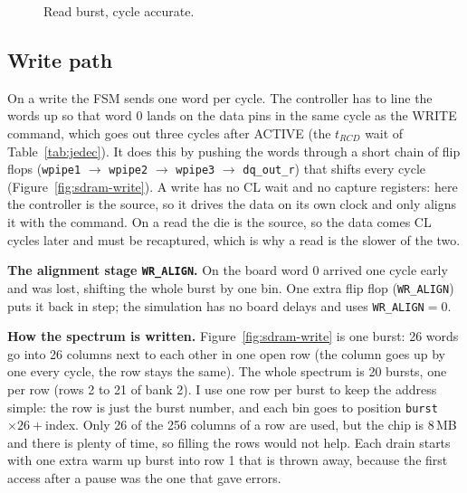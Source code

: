 \documentclass[a4paper,10pt]{article}
\newcommand{\wbus}[4]{%
  \draw[line width=0.6pt, fill=white]
    ({#1+0.06},{#3+0.17}) -- ({#2-0.06},{#3+0.17}) -- (#2,#3) -- ({#2-0.06},{#3-0.17})
    -- ({#1+0.06},{#3-0.17}) -- (#1,#3) -- cycle;
  \node[font=\tiny] at ({(#1+#2)/2},#3) {#4};}
\newcommand{\widle}[3]{\draw[line width=0.6pt] (#1,#3) -- (#2,#3);}
\newcommand{\wcut}[3]{%
  \draw[line width=0.5pt, fill=white] ({#1-0.10},#2) -- ({#1+0.10},#2) --
       ({#1+0.22},#3) -- ({#1+0.02},#3) -- cycle;
  \draw[line width=0.7pt] ({#1-0.10},#2) -- ({#1+0.02},#3);
  \draw[line width=0.7pt] ({#1+0.10},#2) -- ({#1+0.22},#3);}
\begin{document}
\begin{figure}[H]
\caption{Read burst, cycle accurate.}
\label{fig:sdram-read}
\end{figure}

\subsection{Write path}
\label{sec:sdram-write}

On a write the FSM sends one word per cycle. The controller has to line the words up so that
word 0 lands on the data pins in the same cycle as the WRITE command, which
goes out three cycles after ACTIVE (the $t_{RCD}$ wait of Table~\ref{tab:jedec}). It does this by pushing the words through a
short chain of flip flops (\texttt{wpipe1} $\to$ \texttt{wpipe2} $\to$
\texttt{wpipe3} $\to$ \texttt{dq\_out\_r}) that shifts every cycle
(Figure~\ref{fig:sdram-write}). A write has no CL wait and no capture registers: here
the controller is the source, so it drives the data on its own clock and only aligns it
with the command. On a read the die is the source, so the data comes CL cycles later and
must be recaptured, which is why a read is the slower of the two.

\textbf{The alignment stage \texttt{WR\_ALIGN}.} On the board word 0 arrived one cycle
early and was lost, shifting the whole burst by one bin. One extra flip flop
(\texttt{WR\_ALIGN}) puts it back in step; the simulation has no board delays and uses
\texttt{WR\_ALIGN}$=0$.

\textbf{How the spectrum is written.} Figure~\ref{fig:sdram-write} is one burst: 26 words
go into 26 columns next to each other in one open row (the column goes up by one every
cycle, the row stays the same). The whole spectrum is 20 bursts, one per row (rows 2 to 21
of bank 2). I use one row per burst to keep the address simple: the row is just the burst
number, and each bin goes to position \texttt{burst}$\times26+$index. Only 26 of the 256
columns of a row are used, but the chip is 8\,MB and there is plenty of time, so filling
the rows would not help. Each drain starts with one extra warm up burst into row 1 that is
thrown away, because the first access after a pause was the one that gave errors.
\end{document}
